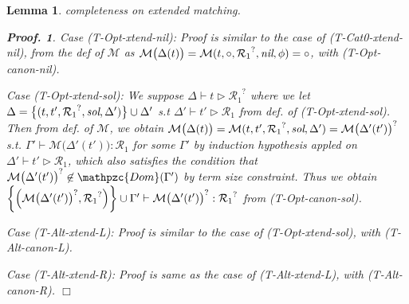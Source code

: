 \documentclass[12pt]{article}
\newtheorem{Lemma}{Lemma}[section]
\newtheorem{Proof}{Proof.}
\begin{document}
\begin{Lemma}{completeness on extended matching.}
\begin{Proof}
    Case (T-Opt-xtend-nil):
    Proof is similar to the case of (T-Cat0-xtend-nil), from the def of
    $\mathcal{M}$ as
    $\mathcal{M}\bigl(\Delta(t) \bigr) =
    \mathcal{M}(t, \circ, {\mathcal{R}_1}^?, \text{\it nil}, \phi) =
    \circ$, with (T-Opt-canon-nil).

    Case (T-Opt-xtend-sol):
    We suppose
    $\Delta \vdash t \triangleright {\mathcal{R}_1}^?$ where we let
    $\Delta = \bigl\{(t, t', {\mathcal{R}_1}^?, \text{\it sol}, \Delta')
    \bigr\} \cup \Delta'$ s.t
    $\Delta' \vdash t' \triangleright \mathcal{R}_1$ from def. of
    (T-Opt-xtend-sol). Then from def. of $\mathcal{M}$, we obtain
    $\mathcal{M}\bigl(\Delta(t) \bigr) =
    \mathcal{M}(t, t', {\mathcal{R}_1}^?, \text{\it sol}, \Delta') =
    {\mathcal{M}\bigl(\Delta'(t') \bigr)}^?$ s.t.
    $\Gamma' \vdash \mathcal{M}\bigl(\Delta'(t') \bigr) : \mathcal{R}_1$
    for some $\Gamma'$ by induction hypothesis appled on
    $\Delta' \vdash t' \triangleright \mathcal{R}_1$, which also satisfies
    the condition that
    ${\mathcal{M}\bigl(\Delta'(t') \bigr)}^? \not\in \mathpzc{Dom}(
    \Gamma')$ by term size constraint. Thus we obtain
    $\biggl\{\Bigl({\mathcal{M}\bigl(\Delta'(t') \bigr)}^?,
    {\mathcal{R}_1}^? \Bigr) \biggr\} \cup \Gamma' \vdash
    {\mathcal{M}\bigl(\Delta'(t') \bigr)}^? : {\mathcal{R}_1}^?$ from
    (T-Opt-canon-sol).
    
    Case (T-Alt-xtend-L):
    Proof is similar to the case of (T-Opt-xtend-sol), with
    (T-Alt-canon-L).
    
    Case (T-Alt-xtend-R):
    Proof is same as the case of (T-Alt-xtend-L), with (T-Alt-canon-R).
    $\Box$
  \end{Proof}
\end{Lemma}
\end{document}
